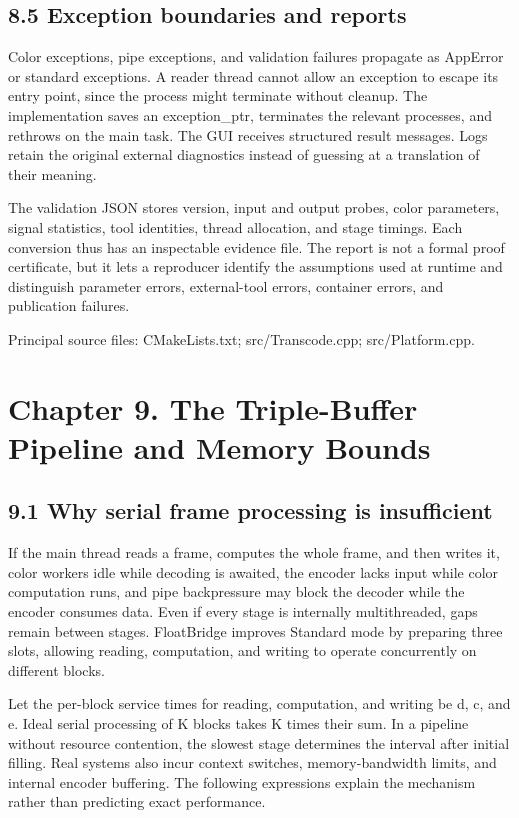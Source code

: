 \documentclass[11pt,a4paper,openany]{book}
\begin{document}
\section*{8.5 Exception boundaries and reports}
Color exceptions, pipe exceptions, and validation failures propagate as AppError or standard exceptions. A reader thread cannot allow an exception to escape its entry point, since the process might terminate without cleanup. The implementation saves an exception\_ptr, terminates the relevant processes, and rethrows on the main task. The GUI receives structured result messages. Logs retain the original external diagnostics instead of guessing at a translation of their meaning.

The validation JSON stores version, input and output probes, color parameters, signal statistics, tool identities, thread allocation, and stage timings. Each conversion thus has an inspectable evidence file. The report is not a formal proof certificate, but it lets a reproducer identify the assumptions used at runtime and distinguish parameter errors, external-tool errors, container errors, and publication failures.


\par\small Principal source files: CMakeLists.txt; src/Transcode.cpp; src/Platform.cpp.\normalsize

\chapter*{Chapter 9. The Triple-Buffer Pipeline and Memory Bounds}

\section*{9.1 Why serial frame processing is insufficient}
If the main thread reads a frame, computes the whole frame, and then writes it, color workers idle while decoding is awaited, the encoder lacks input while color computation runs, and pipe backpressure may block the decoder while the encoder consumes data. Even if every stage is internally multithreaded, gaps remain between stages. FloatBridge improves Standard mode by preparing three slots, allowing reading, computation, and writing to operate concurrently on different blocks.

Let the per-block service times for reading, computation, and writing be d, c, and e. Ideal serial processing of K blocks takes K times their sum. In a pipeline without resource contention, the slowest stage determines the interval after initial filling. Real systems also incur context switches, memory-bandwidth limits, and internal encoder buffering. The following expressions explain the mechanism rather than predicting exact performance.
\end{document}

